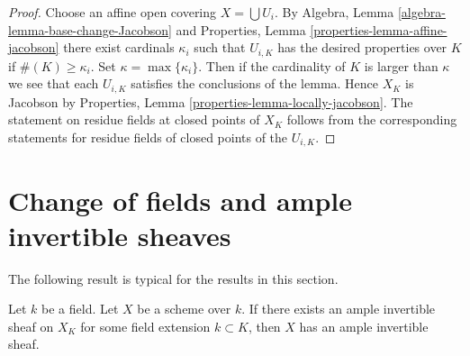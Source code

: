 \begin{proof}
Choose an affine open covering $X = \bigcup U_i$.
By
Algebra, Lemma \ref{algebra-lemma-base-change-Jacobson}
and
Properties, Lemma \ref{properties-lemma-affine-jacobson}
there exist cardinals $\kappa_i$ such that $U_{i, K}$ has
the desired properties over $K$ if $\#(K) \geq \kappa_i$.
Set $\kappa = \max\{\kappa_i\}$. Then if the cardinality of
$K$ is larger than $\kappa$ we see that each $U_{i, K}$ satisfies
the conclusions of the lemma. Hence $X_K$ is Jacobson by
Properties, Lemma \ref{properties-lemma-locally-jacobson}.
The statement on residue fields at closed points of $X_K$
follows from the corresponding
statements for residue fields of closed points of the $U_{i, K}$.
\end{proof}





\section{Change of fields and ample invertible sheaves}
\label{section-change-fields-ample}

\noindent
The following result is typical for the results in this section.

\begin{lemma}
\label{lemma-ample-after-field-extension}
Let $k$ be a field. Let $X$ be a scheme over $k$.
If there exists an ample invertible sheaf on $X_K$ for some
field extension $k \subset K$, then $X$ has an ample invertible
sheaf.
\end{lemma}

